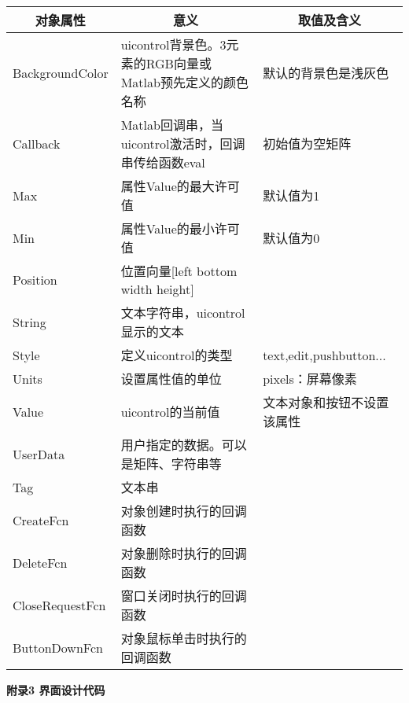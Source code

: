 \begin{tabular}{|p{3cm}|p{5cm}|p{5cm}|}
	\hline
	\multicolumn{1}{|c|}{\textbf{对象属性}}	&\multicolumn{1}{c}{\textbf{意义}}	&\multicolumn{1}{|c|}{\textbf{取值及含义}}\\	\hline
	BackgroundColor	&uicontrol背景色。3元素的RGB向量或Matlab预先定义的颜色名称	&默认的背景色是浅灰色		\\	\hline
	Callback		&Matlab回调串，当uicontrol激活时，回调串传给函数eval	   &初始值为空矩阵			\\	\hline
	Max				&属性Value的最大许可值									 &默认值为1				\\	\hline
	Min				&属性Value的最小许可值									 &默认值为0				\\	\hline
	Position		&位置向量[left bottom width height]					   	&					    \\	\hline
	String			&文本字符串，uicontrol显示的文本						    &					 \\	\hline
	Style			&定义uicontrol的类型					&text,edit,pushbutton...				\\	\hline
	Units			&设置属性值的单位										&pixels：屏幕像素		\\	\hline
	Value			&uicontrol的当前值										&文本对象和按钮不设置该属性	\\	\hline
	UserData		&用户指定的数据。可以是矩阵、字符串等						&						\\	\hline
	Tag				&文本串												&						\\	\hline
	CreateFcn		&对象创建时执行的回调函数								&						\\	\hline
	DeleteFcn		&对象删除时执行的回调函数								&						\\	\hline
	CloseRequestFcn		&窗口关闭时执行的回调函数							&						\\	\hline
	ButtonDownFcn		&对象鼠标单击时执行的回调函数						  &						\\	\hline
\end{tabular}
\newpage
\begin{center}
	\textbf{附录3 界面设计代码}
\end{center}
